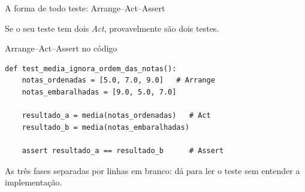 \documentclass[aspectratio=169]{beamer}
\begin{document}
\begin{frame}{A forma de todo teste: Arrange--Act--Assert}
  \begin{center}
  \end{center}
  \vspace{0.2em}
  \small Se o seu teste tem dois \emph{Act}, provavelmente são dois testes.
\end{frame}

\begin{frame}[fragile]{Arrange--Act--Assert no código}
\begin{lstlisting}
def test_media_ignora_ordem_das_notas():
    notas_ordenadas = [5.0, 7.0, 9.0]   # Arrange
    notas_embaralhadas = [9.0, 5.0, 7.0]

    resultado_a = media(notas_ordenadas)   # Act
    resultado_b = media(notas_embaralhadas)

    assert resultado_a == resultado_b      # Assert
\end{lstlisting}
  \small As três fases separadas por linhas em branco: dá para ler o
  teste sem entender a implementação.
\end{frame}
\end{document}
